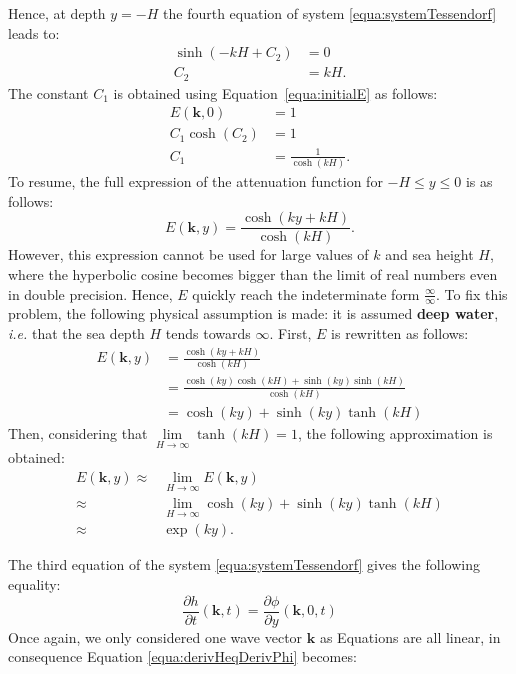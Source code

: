 \documentclass[11pt]{article}
\def\ie{\emph{i.e.}\xspace}
\begin{document}
Hence, at depth $y=-H$ the fourth equation of system \ref{equa:systemTessendorf} leads to:
\begin{align}
	\sinh(-kH+C_2) & = 0 \nonumber \\
	C_2            & = kH.
\end{align}
The constant $C_1$ is obtained using Equation~\ref{equa:initialE} as follows:
\begin{align}
	E(\mathbf{k},0) & =1\nonumber           \\
	C_1\cosh(C_2)   & =1\nonumber           \\
	C_1             & =\frac{1}{\cosh(kH)}.
\end{align}
To resume, the full expression of the attenuation function for $-H\leq y\leq 0$ is as follows:
\begin{equation}
	E(\mathbf{k}, y)=\frac{\cosh\left(ky+kH\right)}{\cosh(kH)}.
\end{equation}
However, this expression cannot be used for large values of $k$ and sea height $H$, where the hyperbolic cosine becomes bigger than the limit of real numbers even in double precision.
Hence, $E$ quickly reach the indeterminate form $\frac{\infty}{\infty}$.
To fix this problem, the following physical assumption is made: it is assumed \textbf{deep water}, \ie that the sea depth $H$ tends towards $\infty$.
First, $E$ is rewritten as follows:
\begin{align*}
	E(\mathbf{k},y) & = \frac{\cosh(ky+kH)}{\cosh(kH)}\nonumber                            \\
	                & = \frac{\cosh(ky)\cosh(kH) + \sinh(ky)\sinh(kH)}{\cosh(kH)}\nonumber \\
	                & = \cosh(ky) + \sinh(ky)\tanh(kH)
\end{align*}
Then, considering that $\underset{H \rightarrow \infty}{\lim}\tanh(kH)=1$, the following approximation is obtained:
\begin{align}\label{equa:attenuationDeep1}
	E(\mathbf{k},y) \approx & \underset{H \rightarrow \infty}{\lim} E(\mathbf{k},y)\nonumber               \\
	\approx                 & \underset{H \rightarrow \infty}{\lim}\cosh(ky) + \sinh(ky)\tanh(kH)\nonumber \\
	\approx                 & \exp(ky).
\end{align}

The third equation of the system \ref{equa:systemTessendorf} gives the following equality:
\begin{equation}
	\label{equa:derivHeqDerivPhi}
	\frac{\partial h}{\partial t}(\mathbf{k},t)=\frac{\partial\phi}{\partial y}(\mathbf{k}, 0, t)
\end{equation}
Once again, we only considered one wave vector $\mathbf{k}$ as Equations are all linear, in consequence Equation \ref{equa:derivHeqDerivPhi} becomes:
\end{document}
